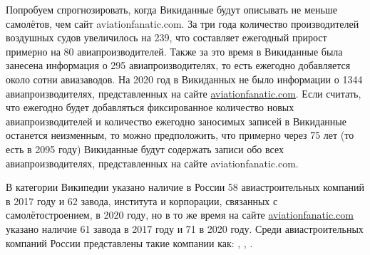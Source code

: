 Попробуем спрогнозировать, когда Викиданные будут описывать не меньше самолётов, 
чем сайт aviationfanatic.com. 
За три года количество производителей воздушных судов увеличилось на 239, 
что составляет ежегодный прирост примерно на 80 авиапроизводителей. 
Также за это время в Викиданные была занесена информация о 295 авиапроизводителях, 
то есть ежегодно добавляется около сотни авиазаводов. 
На 2020 год в Викиданных не было информации о \num{1344} авиапроизводителях, 
представленных на сайте \href{https://www.aviationfanatic.com/}{aviationfanatic.com}. 
Если считать, что ежегодно будет добавляться фиксированное количество новых авиапроизводителей 
и количество ежегодно заносимых записей в Викиданные останется неизменным, 
то можно предположить, что примерно через 75 лет (то есть в 2095 году) 
Викиданные будут содержать записи обо всех авиапроизводителях, представленных на сайте aviationfanatic.com.

В категории Википедии  указано наличие в России 58 авиастроительных компаний в 2017 году 
и 62 завода, института и корпорации, связанных с самолётостроением, в 2020 году, 
но в то же время на сайте \href{https://www.aviationfanatic.com/}{aviationfanatic.com} 
указано наличие 61 завода\autocite{count_plants_of_aircrafts} в 2017 году и 71 в 2020 году. 
Среди авиастроительных компаний России 
представлены такие компании как: , , .




